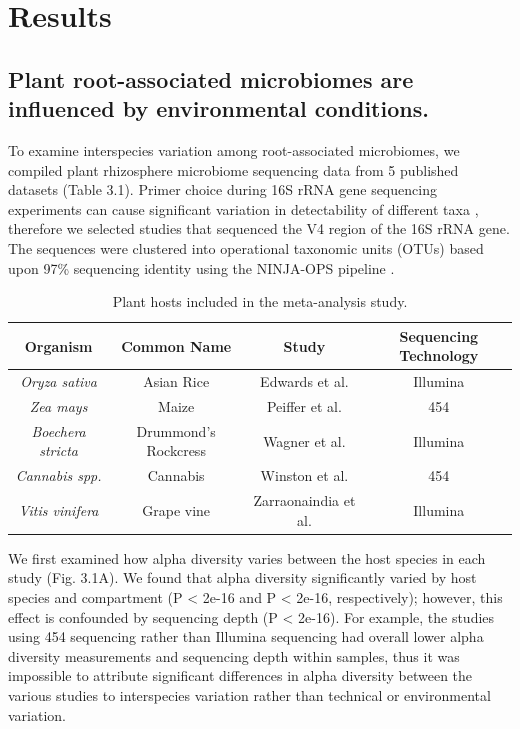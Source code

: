 \section{Results}
\subsection{Plant root-associated microbiomes are influenced by environmental conditions.}
To examine interspecies variation among root-associated microbiomes, we compiled plant rhizosphere microbiome sequencing data from 5 published datasets (Table 3.1). Primer choice during 16S rRNA gene sequencing experiments can cause significant variation in detectability of different taxa \cite{Debelius2016}, therefore we selected studies that sequenced the V4 region of the 16S rRNA gene. The sequences were clustered into operational taxonomic units (OTUs) based upon 97\% sequencing identity using the NINJA-OPS pipeline \cite{Al-Ghalith2016}. 

\begin{table}[ht]
\centering
\small
{}
\caption[Table 3.1]{Plant hosts included in the meta-analysis study.}
\begin{tabular}{c|ccc}
\hline
\textbf{Organism}& \textbf{Common Name} & \textbf{Study} & \textbf{Sequencing Technology} \\
\hline
\rowcolor{Gray}
\textit{Oryza sativa}& Asian Rice & Edwards et al. \cite{Edwards2015} & Illumina \\
\textit{Zea mays}& Maize & Peiffer et al. \cite{Peiffer2013} & 454 \\
\rowcolor{Gray}
\textit{Boechera stricta}& Drummond's Rockcress & Wagner et al. \cite{Wagner2016} & Illumina \\
\textit{Cannabis spp.}& Cannabis & Winston et al. \cite{Winston2014} & 454 \\
\rowcolor{Gray}
\textit{Vitis vinifera}& Grape vine & Zarraonaindia et al. \cite{Zarraonaindia2015} & Illumina \\
\hline
\end{tabular}
\end{table}

We first examined how alpha diversity varies between the host species in each study (Fig. 3.1A). We found that alpha diversity significantly varied by host species and compartment (P < 2e-16 and P < 2e-16, respectively); however, this effect is confounded by sequencing depth (P < 2e-16). For example, the studies using 454 sequencing rather than Illumina sequencing had overall lower alpha diversity measurements and sequencing depth within samples, thus it was impossible to attribute significant differences in alpha diversity between the various studies to interspecies variation rather than technical or environmental variation. 


